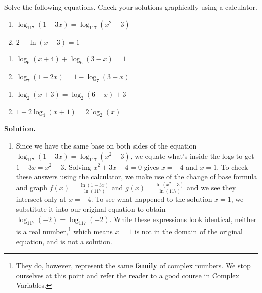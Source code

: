 \begin{ex}  \label{LogEqnsEx1} Solve the following equations.  Check your solutions graphically using a calculator.

\begin{multicols}{2}
\begin{enumerate}

\item  $\log_{117}(1-3x) = \log_{117}\left(x^2-3\right)$

\item  $2 - \ln(x-3) = 1$

\setcounter{HW}{\value{enumi}}
\end{enumerate}
\end{multicols}

\begin{multicols}{2}
\begin{enumerate}
\setcounter{enumi}{\value{HW}}

\item  $\log_{6}(x+4) + \log_{6}(3-x) = 1$

\item  $\log_{7}(1-2x) = 1 - \log_{7}(3-x)$
\setcounter{HW}{\value{enumi}}
\end{enumerate}
\end{multicols}

\begin{multicols}{2}
\begin{enumerate}
\setcounter{enumi}{\value{HW}}

\item  $\log_{2}(x+3) = \log_{2}(6-x)+3$

\item  $1 + 2 \log_{4}(x+1) = 2 \log_{2}(x)$

\end{enumerate}
\end{multicols}

{\bf Solution.}

\begin{enumerate}

\item  Since we have the same base on both sides of the equation $\log_{117}(1-3x) = \log_{117}\left(x^2-3\right)$, we equate what's inside the logs to get $1-3x = x^2-3$.  Solving $x^2+3x-4 = 0$ gives $x=-4$ and $x=1$. To check these answers using the calculator, we make use of the change of base formula and graph $f(x) = \frac{\ln(1-3x)}{\ln(117)}$ and $g(x) = \frac{\ln\left(x^2-3\right)}{\ln(117)}$ and we see they intersect only at $x=-4$.  To see what happened to the solution $x=1$, we substitute it into our original equation to obtain  $\log_{117}(-2) =  \log_{117}(-2)$.  While these expressions look identical, neither is a real number,\footnote{They do, however, represent the same \textbf{family} of complex numbers.  We stop ourselves at this point and refer the reader to a good course in Complex Variables.} which means $x=1$ is not in the domain of the original equation, and is not a solution.    


\end{enumerate}
\end{ex}
